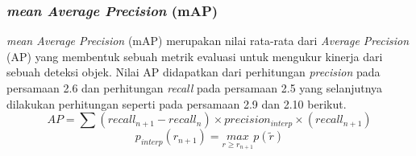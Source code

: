\subsubsection{\emph{mean Average Precision} (mAP)}
\label{subsec:mAP}

\emph{mean Average Precision} (mAP) merupakan nilai rata-rata dari \emph{Average Precision} (AP) yang membentuk sebuah metrik evaluasi
untuk mengukur kinerja dari sebuah deteksi objek. Nilai AP didapatkan dari perhitungan \emph{precision} pada persamaan 2.6 dan perhitungan
\emph{recall} pada persamaan 2.5 yang selanjutnya dilakukan perhitungan seperti pada persamaan 2.9 dan 2.10 berikut.
\begin{equation}
  AP = \sum (recall_{n+1}-recall_{n}) \times precision_{interp} \times (recall_{n+1})
\end{equation}
\begin{equation}
  p_{interp}(r_{n+1}) = \underset{r\geq r_{n+1}}{max} p(\tilde{r})
\end{equation}
